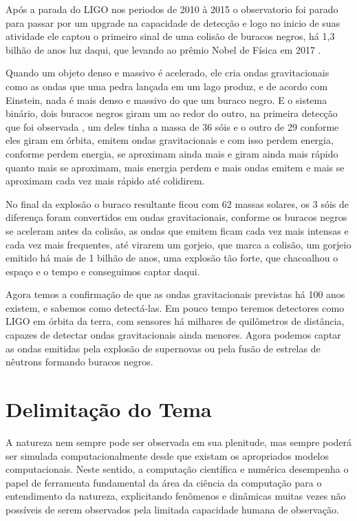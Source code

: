 Após a parada do LIGO nos periodos de 2010 à 2015 o observatorio foi parado para passar por um upgrade na capacidade de detecção e logo no inicio de suas atividade ele captou o primeiro sinal de uma colisão de buracos negros, há 1,3 bilhão de anos luz daqui, que levando ao prêmio Nobel de Física em 2017 \cite{abbott2016observation}. 
 
Quando um objeto denso e massivo é acelerado, ele cria ondas gravitacionais como as ondas que uma pedra lançada em um lago produz, e de acordo com Einstein, nada é mais denso e massivo do que um buraco negro. E o sistema binário, dois buracos negros giram um ao redor do outro, na primeira detecção que foi observada \cite{abbott2016observation}, um deles tinha a massa de 36 sóis e o outro de 29 conforme eles giram em órbita, emitem ondas gravitacionais e com isso perdem energia, conforme perdem energia, se aproximam ainda mais e giram ainda mais rápido quanto mais se aproximam, mais energia perdem e mais ondas emitem e mais se aproximam cada vez mais rápido até colidirem.

No final da explosão o buraco resultante ficou com 62 massas solares, os 3 sóis de diferença foram convertidos em ondas gravitacionais, conforme os buracos negros se aceleram antes da colisão, as ondas que emitem ficam cada vez mais intensas e cada vez mais frequentes, até virarem um gorjeio, que marca a colisão, um gorjeio emitido há mais de 1 bilhão de anos, uma explosão tão forte, que chacoalhou o espaço e o tempo e conseguimos captar daqui.

Agora temos a confirmação de que as ondas gravitacionais previstas há 100 anos existem, e sabemos como detectá-las. Em pouco tempo teremos detectores como LIGO em órbita da terra, com sensores há milhares de quilômetros de distância, capazes de detectar ondas gravitacionais ainda menores. Agora podemos captar as ondas emitidas pela explosão de supernovas ou pela fusão de estrelas de nêutrons formando buracos negros.


\section{Delimitação do Tema}

A natureza nem sempre pode ser observada em sua plenitude, mas sempre poderá ser simulada computacionalmente desde que existam os apropriados modelos computacionais. Neste sentido, a computação científica e numérica desempenha o papel de ferramenta fundamental da área da ciência da computação para o entendimento da natureza, explicitando fenômenos e dinâmicas muitas vezes não possíveis de serem observados pela limitada capacidade humana de observação.

